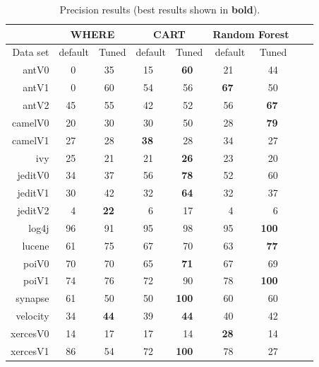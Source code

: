 \documentclass[smallextended]{svjour3}
\begin{document}
\begin{table}[!t]
\renewcommand{\baselinestretch}{0.8} 
\scriptsize    

\begin{tabular}{r|rl|rl|rl|rl|rl|rlrl}
      &   \multicolumn{4}{c|}{WHERE}         &   \multicolumn{4}{c|}{CART}         &   \multicolumn{4}{c}{Random Forest}         \\\hline
  Data set   &   \multicolumn{2}{c}{default}         &   \multicolumn{2}{c|}{Tuned}         &   \multicolumn{2}{c}{default}         &   \multicolumn{2}{c|}{Tuned}    &   \multicolumn{2}{c}{default}  &   \multicolumn{2}{c}{Tuned}\\\hline
antV0 & 0 &   & 35 &   & 15 &   & {\bf 60} &   & 21 &   & 44 &  \\
antV1 & 0 &   & 60 &   & 54 &   & 56 &   & {\bf 67} &   & 50 &  \\
antV2 & 45 &   & 55 &   & 42 &   & 52 &   & 56 &   & {\bf 67} &  \\
camelV0 & 20 &   & 30 &   & 30 &   & 50 &   & 28 &   & {\bf 79} &  \\
camelV1 & 27 &   & 28 &   & {\bf 38} &   & 28 &   & 34 &   & 27 &  \\
ivy & 25 &   & 21 &   & 21 &   & {\bf 26} &   & 23 &   & 20 &  \\
jeditV0 & 34 &   & 37 &   & 56 &   & {\bf 78} &   & 52 &   & 60 &  \\
jeditV1 & 30 &   & 42 &   & 32 &   & {\bf 64} &   & 32 &   & 37 &  \\
jeditV2 & 4 &   & {\bf 22} &   & 6 &   & 17 &   & 4 &   & 6 &  \\
log4j & 96 &   & 91 &   & 95 &   & 98 &   & 95 &   & {\bf 100} &  \\
lucene & 61 &   & 75 &   & 67 &   & 70 &   & 63 &   & {\bf 77} &  \\
poiV0 & 70 &   & 70 &   & 65 &   & {\bf 71} &   &  67 &   & 69 &  \\
poiV1 & 74 &   & 76 &   & 72 &   & 90 &   & 78 &   & {\bf 100} &  \\
synapse & 61 &   & 50 &   & 50 &   & {\bf 100} &   & 60 &   & 60 &  \\
velocity & 34 &   & {\bf 44} &   & 39 &   & {\bf 44} &   & 40 &   & 42 &  \\
xercesV0 & 14 &   & 17 &   & 17 &   & 14 &   & {\bf 28} &   & 14 &  \\
xercesV1 & 86 &   & 54 &   & 72 &   & {\bf 100} &   & 78 &   & 27 &  \\
\end{tabular}
\caption{Precision results (best results  shown in {\bf bold}).}
\label{tab:precisionbars}
\end{table}
 
\end{document}
